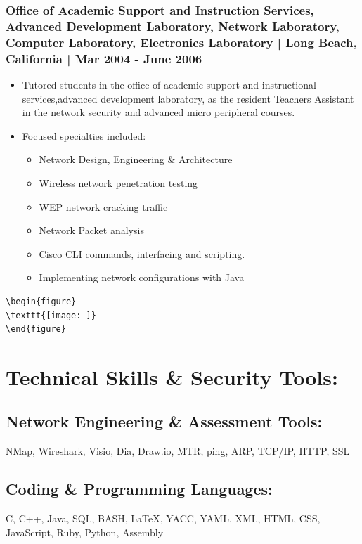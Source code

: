 \documentclass[letter,10pt]{article}
\begin{document}
\subsubsection*{Office of Academic Support and Instruction Services, Advanced Development Laboratory, Network Laboratory, Computer Laboratory, Electronics Laboratory | Long Beach, California | Mar 2004 - June 2006}
\label{sec:org6d0a459}
\begin{itemize}
\item Tutored students in the office of academic support and instructional services,advanced development laboratory, as the resident Teachers Assistant in the network security and advanced micro peripheral courses.
\item Focused specialties included:
\begin{itemize}
\item Network Design, Engineering \& Architecture
\item Wireless network penetration testing
\item WEP network cracking traffic
\item Network Packet analysis
\item Cisco CLI commands, interfacing and scripting.
\item Implementing network configurations with Java
\end{itemize}
\end{itemize}

\begin{verbatim}
\begin{figure}
\texttt{[image: ]}
\end{figure}
\end{verbatim}
\section*{Technical Skills \& Security Tools:}
\label{sec:org25b4a60}
\subsection*{Network Engineering \& Assessment Tools:}
\label{sec:orgb568571}
NMap, Wireshark, Visio, Dia, Draw.io, MTR, ping, ARP, TCP/IP, HTTP, SSL
\subsection*{Coding \& Programming Languages:}
\label{sec:org4b5123b}
C, C++, Java, SQL, BASH, \LaTeX{}, YACC, YAML, XML, HTML, CSS, JavaScript, Ruby, Python, Assembly
\end{document}
